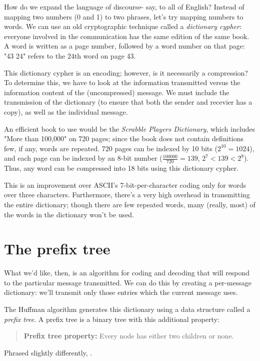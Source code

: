 How do we expand the language of discourse- say, to all of English? Instead of mapping two numbers (0 and 1) to two phrases, let's try mapping numbers to words. We can use an old cryptographic technique called a \textit{dictionary cypher}: everyone involved in the communication has the same edition of the same book. A word is written as a page number, followed by a word number on that page: "43 24" refers to the 24th word on page 43.

This dictionary cypher is an encoding; however, is it necessarily a compression? To determine this, we have to look at the information transmitted versus the information content of the (uncompressed) message. We must include the transmission of the dictionary (to ensure that both the sender and recevier has a copy), as well as the individual message.

An efficient book to use would be the \textit{Scrabble Players Dictionary}, which includes "More than 100,000\ldotswords" on 720 pages; since the book does not contain definitions few, if any, words are repeated. 
720 pages can be indexed by 10 bits ($2^{10}=1024$), and each page can be indexed by an 8-bit number ($\frac{100000}{720}=139$, $2^7 < 139 < 2^8$). Thus, any word can be compressed into 18 bits using this dictionary cypher.

This is an improvement over ASCII's 7-bit-per-character coding only for words over three characters. Furthermore, there's a very high overhead in transmitting the entire dictionary; though there are few repeated words, many (really, most) of the words in the dictionary won't be used. 

\section{The prefix tree}

What we'd like, then, is an algorithm for coding and decoding that will respond to the particular message transmitted. We can do this by creating a per-message dictionary: we'll transmit only those entries which the current message uses.

The Huffman algorithm generates this dictionary using a data structure called a \textit{prefix tree}. A prefix tree is a binary tree with this additional property:
\begin{quotation}
\textbf{Prefix tree property:} Every node has either two children or none.
\end{quotation}
Phrased slightly differently, .

